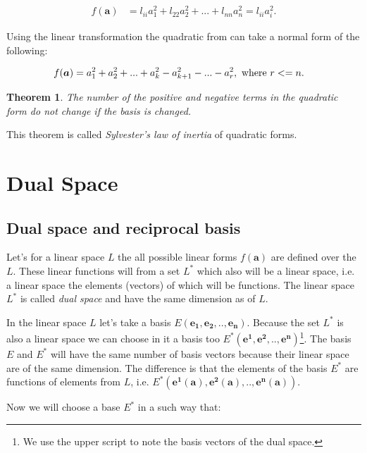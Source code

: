 \documentclass{book}
\newtheorem{theorem}{Theorem}
\begin{document}
\begin{align}
    f(\boldsymbol{a}) &= l_{ii}a_{1}^2 + l_{22}a_{2}^2 + ... + l_{nn}a_{n}^2 = l_{ii}a_{i}^2.
\end{align}

Using the linear transformation the quadratic from can take a normal form of the following:

\begin{align}
    f(\boldsymbol{a}) &= a_{1}^2 + a_{2}^2 + ... + a_{k}^2 - a_{k+1}^2 - ... - a_{r}^2, \textnormal{ where } r <= n.  
\end{align}

\begin{theorem}
The number of the positive and negative terms in the quadratic form do not change if the basis is changed.
\end{theorem}

This theorem is called  \emph{Sylvester's law of inertia} of quadratic forms.

\chapter{Dual Space}

\section{Dual space and reciprocal basis}

Let's for a linear space $L$ the all possible linear forms $f(\boldsymbol{a})$ are defined over the $L$. These linear functions will from a set $L^*$ which also will be a linear space, i.e. a linear space the elements (vectors) of which will be functions. The linear space $L^*$ is called \emph{dual space} and have the same dimension as of $L$.

In the linear space $L$ let's take a basis $E(\boldsymbol{e_1}, \boldsymbol{e_2}, .., \boldsymbol{e_n})$. Because the set $L^*$ is also a linear space we can choose in it a basis too $E^{*}(\boldsymbol{e^{1}}, \boldsymbol{e^{2}}, .., \boldsymbol{e^{n}})$\footnote{We use the upper script to note the basis vectors of the dual space.}. The basis $E$ and $E^{*}$ will have the same number of basis vectors because their linear space are of the same dimension. The difference is that the elements of the basis $E^*$ are functions of elements from $L$, i.e. $E^{*}(\boldsymbol{e^{1}}(\boldsymbol{a}), \boldsymbol{e^{2}}(\boldsymbol{a}), .., \boldsymbol{e^{n}}(\boldsymbol{a}))$.

Now we will choose a base $E^*$ in a such way that:
\end{document}
